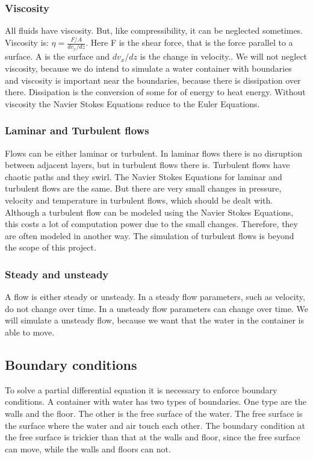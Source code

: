 \documentclass{article}
\begin{document}
\subsubsection{Viscosity}
All fluids have viscosity. But, like compressibility, it can be neglected sometimes. Viscosity is: \(\eta=\frac{F/A}{dv_{x}/dz }\). Here F is the shear force, that is the force parallel to a surface. A is the surface and \(dv_{x}/dz\) is the change in velocity.\cite{Viscosity}. We will not neglect viscosity, because we do intend to simulate a water container with boundaries and viscosity is important near the boundaries, because there is dissipation over there.\cite{NSE features} Dissipation is the conversion of some for of energy to heat energy\cite{Dissipation}. Without viscosity the Navier Stokes Equations reduce to the Euler Equations\cite{NSE features}.
\subsubsection{Laminar and Turbulent flows}
Flows can be either laminar or turbulent\cite{NSE features}. In laminar flows there is no disruption between adjacent layers, but in turbulent flows there is. Turbulent flows have chaotic paths and they swirl. The Navier Stokes Equations for laminar and turbulent flows are the same. But there are very small changes in pressure, velocity and temperature in turbulent flows, which should be dealt with. Although a turbulent flow can be modeled using the Navier Stokes Equations, this costs a lot of computation power due to the small changes.\cite{Turbulence} Therefore, they are often modeled in another way. The simulation of turbulent flows is beyond the scope of this project.
\subsubsection{Steady and unsteady} \label{(un)steady}
A flow is either steady or unsteady\cite{NSE features}. In a steady flow parameters, such as velocity, do not change over time. In a unsteady flow parameters can change over time.\cite{Steady and unsteady} We will simulate a unsteady flow, because we want that the water in the container is able to move.
\subsection{Boundary conditions}
To solve a partial differential equation it is necessary to enforce boundary conditions. A container with water has two types of boundaries. One type are the walls and the floor. The other is the free surface of the water. The free surface is the surface where the water and air touch each other. The boundary condition at the free surface is trickier than that at the walls and floor, since the free surface can move, while the walls and floors can not. 
\end{document}
